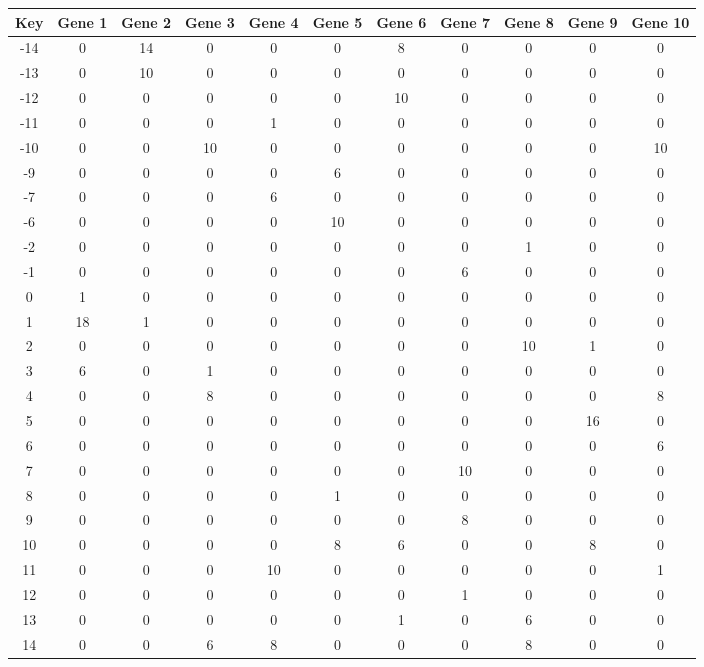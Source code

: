 \begin{tabular}{|c|c|c|c|c|c|c|c|c|c|c|}
\hline
Key & Gene 1 & Gene 2 & Gene 3 & Gene 4 & Gene 5 & Gene 6 & Gene 7 & Gene 8 & Gene 9 & Gene 10 \\
\hline
-14 & 0 & 14 & 0 & 0 & 0 & 8 & 0 & 0 & 0 & 0 \\
-13 & 0 & 10 & 0 & 0 & 0 & 0 & 0 & 0 & 0 & 0 \\
-12 & 0 & 0 & 0 & 0 & 0 & 10 & 0 & 0 & 0 & 0 \\
-11 & 0 & 0 & 0 & 1 & 0 & 0 & 0 & 0 & 0 & 0 \\
-10 & 0 & 0 & 10 & 0 & 0 & 0 & 0 & 0 & 0 & 10 \\
-9 & 0 & 0 & 0 & 0 & 6 & 0 & 0 & 0 & 0 & 0 \\
-7 & 0 & 0 & 0 & 6 & 0 & 0 & 0 & 0 & 0 & 0 \\
-6 & 0 & 0 & 0 & 0 & 10 & 0 & 0 & 0 & 0 & 0 \\
-2 & 0 & 0 & 0 & 0 & 0 & 0 & 0 & 1 & 0 & 0 \\
-1 & 0 & 0 & 0 & 0 & 0 & 0 & 6 & 0 & 0 & 0 \\
0 & 1 & 0 & 0 & 0 & 0 & 0 & 0 & 0 & 0 & 0 \\
1 & 18 & 1 & 0 & 0 & 0 & 0 & 0 & 0 & 0 & 0 \\
2 & 0 & 0 & 0 & 0 & 0 & 0 & 0 & 10 & 1 & 0 \\
3 & 6 & 0 & 1 & 0 & 0 & 0 & 0 & 0 & 0 & 0 \\
4 & 0 & 0 & 8 & 0 & 0 & 0 & 0 & 0 & 0 & 8 \\
5 & 0 & 0 & 0 & 0 & 0 & 0 & 0 & 0 & 16 & 0 \\
6 & 0 & 0 & 0 & 0 & 0 & 0 & 0 & 0 & 0 & 6 \\
7 & 0 & 0 & 0 & 0 & 0 & 0 & 10 & 0 & 0 & 0 \\
8 & 0 & 0 & 0 & 0 & 1 & 0 & 0 & 0 & 0 & 0 \\
9 & 0 & 0 & 0 & 0 & 0 & 0 & 8 & 0 & 0 & 0 \\
10 & 0 & 0 & 0 & 0 & 8 & 6 & 0 & 0 & 8 & 0 \\
11 & 0 & 0 & 0 & 10 & 0 & 0 & 0 & 0 & 0 & 1 \\
12 & 0 & 0 & 0 & 0 & 0 & 0 & 1 & 0 & 0 & 0 \\
13 & 0 & 0 & 0 & 0 & 0 & 1 & 0 & 6 & 0 & 0 \\
14 & 0 & 0 & 6 & 8 & 0 & 0 & 0 & 8 & 0 & 0 \\
\hline
\end{tabular}